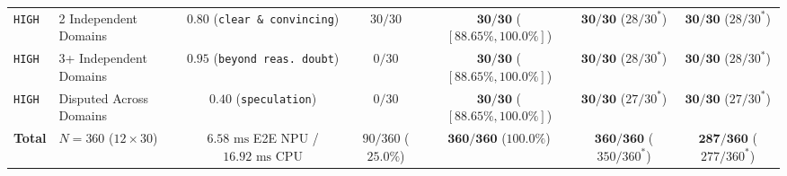 \documentclass[11pt,a4paper]{article}
\begin{document}
\begin{table}[h]
\begin{tabular}{llccccc}
\texttt{HIGH} & 2 Independent Domains & $0.80$ (\texttt{clear \& convincing}) & $30/30$ & $\mathbf{30/30}$ ($[88.65\%, 100.0\%]$) & $\mathbf{30/30}$ ($28/30^*$) & $\mathbf{30/30}$ ($28/30^*$) \\
\texttt{HIGH} & 3+ Independent Domains & $0.95$ (\texttt{beyond reas.\ doubt}) & $0/30$ & $\mathbf{30/30}$ ($[88.65\%, 100.0\%]$) & $\mathbf{30/30}$ ($28/30^*$) & $\mathbf{30/30}$ ($28/30^*$) \\
\texttt{HIGH} & Disputed Across Domains & $0.40$ (\texttt{speculation}) & $0/30$ & $\mathbf{30/30}$ ($[88.65\%, 100.0\%]$) & $\mathbf{30/30}$ ($27/30^*$) & $\mathbf{30/30}$ ($27/30^*$) \\
\midrule
\textbf{Total} & $N=360$ ($12 \times 30$) & $6.58\text{ ms}$ E2E NPU / $16.92\text{ ms}$ CPU & $90/360$ ($25.0\%$) & $\mathbf{360/360}$ ($\mathbf{100.0\%}$) & $\mathbf{360/360}$ ($350/360^*$) & $\mathbf{287/360}$ ($277/360^*$) \\
\bottomrule
\end{tabular}
\end{table}
\end{document}
